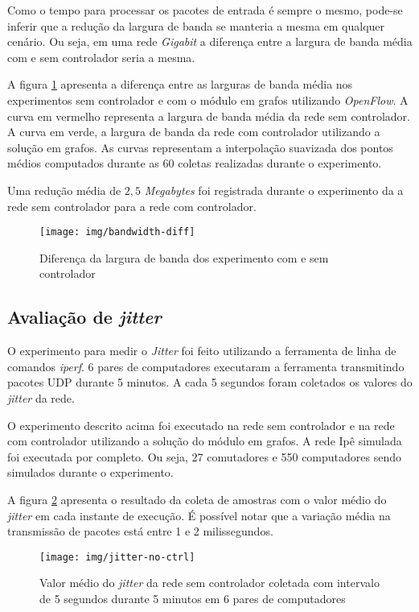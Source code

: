 Como o tempo para processar os pacotes de entrada é sempre o mesmo, pode-se
inferir que a redução da largura de banda se manteria a mesma em qualquer
cenário.
Ou seja, em uma rede \emph{Gigabit} a diferença entre a largura de banda
média com e sem controlador seria a mesma.

A figura \ref{fig:bandwidth-diff} apresenta a diferença entre as larguras de
banda média nos experimentos sem controlador e com o  módulo em grafos
utilizando \emph{OpenFlow}.
A curva em vermelho representa a largura de banda média da rede sem
controlador.
A curva em verde, a largura de banda da rede com controlador utilizando a
solução em grafos.
As curvas representam a interpolação suavizada dos pontos médios computados
durante as 60 coletas realizadas durante o experimento.

Uma redução média de $2,5$ \emph{Megabytes} foi registrada durante o
experimento da a rede sem controlador para a rede com controlador.

\begin{figure}[!htb]
    \centering
    \label{fig:bandwidth-diff}
    \texttt{[image: img/bandwidth-diff]}
    \caption{Diferença da largura de banda dos experimento com e sem
    controlador}
\end{figure}



\subsection{Avaliação de \emph{jitter}}

O experimento para medir o \emph{Jitter} foi feito utilizando a ferramenta
de linha de comandos \emph{iperf}.
6 pares de computadores executaram a ferramenta transmitindo pacotes
UDP durante 5 minutos.
A cada 5 segundos foram coletados os valores do \emph{jitter} da rede.

O experimento descrito acima foi executado na rede sem controlador e na rede
com controlador utilizando a solução do módulo em grafos.
A rede Ipê simulada foi executada por completo.
Ou seja, 27 comutadores e 550 computadores sendo simulados durante o
experimento.

A figura \ref{fig:jitter-no-ctrl} apresenta o resultado da coleta de amostras
com o valor médio do \emph{jitter} em cada instante de execução.
É possível notar que a variação média na transmissão de pacotes está entre
1 e 2 milissegundos.

\begin{figure}[!htb]
    \centering
    \label{fig:jitter-no-ctrl}
    \texttt{[image: img/jitter-no-ctrl]}
    \caption{Valor médio do \emph{jitter} da rede sem controlador coletada com
    intervalo de 5 segundos durante 5 minutos em 6 pares de computadores}
\end{figure}

